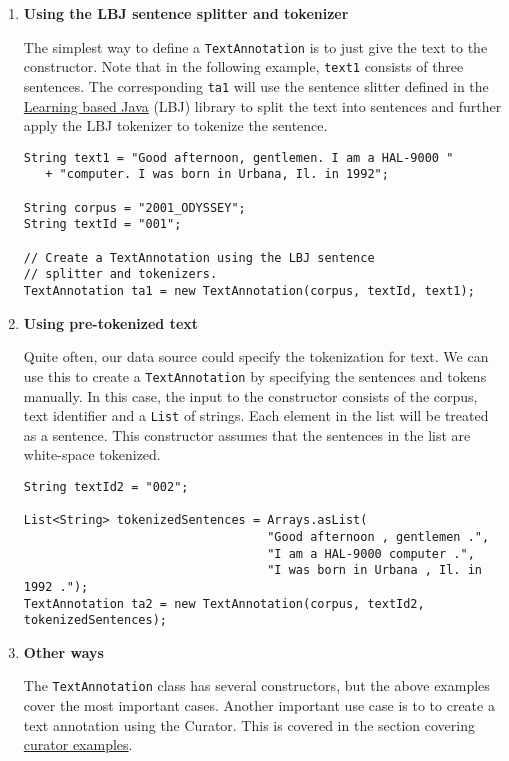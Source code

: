 \documentclass[11pt]{article}
\begin{document}
\begin{enumerate}
\item \textbf{Using the LBJ sentence splitter and tokenizer}

       The simplest way to define a \texttt{TextAnnotation} is to just give the
       text to the constructor. Note that in the following example,
       \texttt{text1} consists of three sentences. The corresponding \texttt{ta1} will
       use the sentence slitter defined in the \href{http://cogcomp.cs.illinois.edu/page/software_view/11}{Learning based Java} (LBJ)
       library to split the text into sentences and further apply the
       LBJ tokenizer to tokenize the sentence.


\lstset{frame=lines,basicstyle=\footnotesize,numbers=left,captionpos=b,showstringspaces=false,numberstyle=\tiny,language=java}
\begin{lstlisting}
String text1 = "Good afternoon, gentlemen. I am a HAL-9000 "
   + "computer. I was born in Urbana, Il. in 1992";

String corpus = "2001_ODYSSEY";
String textId = "001";

// Create a TextAnnotation using the LBJ sentence 
// splitter and tokenizers.
TextAnnotation ta1 = new TextAnnotation(corpus, textId, text1);
\end{lstlisting}
\item \textbf{Using pre-tokenized text}

       Quite often, our data source could specify the tokenization for
       text. We can use this to create a \texttt{TextAnnotation} by specifying
       the sentences and tokens manually. In this case, the input to the
       constructor consists of the corpus, text identifier and a \texttt{List}
       of strings. Each element in the list will be treated as a
       sentence. This constructor assumes that the sentences in the list
       are white-space tokenized.


\lstset{frame=lines,basicstyle=\footnotesize,numbers=left,captionpos=b,showstringspaces=false,numberstyle=\tiny,language=java}
\begin{lstlisting}
String textId2 = "002";

List<String> tokenizedSentences = Arrays.asList(
                                  "Good afternoon , gentlemen .", 
                                  "I am a HAL-9000 computer .",
                                  "I was born in Urbana , Il. in 1992 .");
TextAnnotation ta2 = new TextAnnotation(corpus, textId2, tokenizedSentences);
\end{lstlisting}
\item \textbf{Other ways}

       The \texttt{TextAnnotation} class has several constructors, but the
       above examples cover the most important cases. Another
       important use case is to to create a text annotation using the
       Curator. This is covered in the section covering \hyperref[sec-6-2]{curator examples}.
\end{enumerate}
\end{document}
